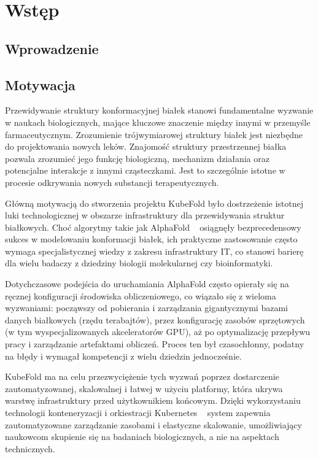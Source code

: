 \chapter{Wstęp}


\section{Wprowadzenie}


\section{Motywacja}

Przewidywanie struktury konformacyjnej białek stanowi fundamentalne wyzwanie w naukach biologicznych, mające kluczowe znaczenie między innymi w przemyśle farmaceutycznym.
Zrozumienie trójwymiarowej struktury białek jest niezbędne do projektowania nowych leków.
Znajomość struktury przestrzennej białka pozwala zrozumieć jego funkcję biologiczną, mechanizm działania oraz potencjalne interakcje z innymi cząsteczkami.
Jest to szczególnie istotne w procesie odkrywania nowych substancji terapeutycznych.

Główną motywacją do stworzenia projektu KubeFold było dostrzeżenie istotnej luki technologicznej w obszarze infrastruktury dla przewidywania struktur białkowych.
Choć algorytmy takie jak AlphaFold ~\cite{alphafold3} osiągnęły bezprecedensowy sukces w modelowaniu konformacji białek, ich praktyczne zastosowanie często wymaga specjalistycznej wiedzy z zakresu infrastruktury IT, co stanowi barierę dla wielu badaczy z dziedziny biologii molekularnej czy bioinformatyki.

Dotychczasowe podejścia do uruchamiania AlphaFold często opierały się na ręcznej konfiguracji środowiska obliczeniowego, co wiązało się z wieloma wyzwaniami: począwszy od pobierania i zarządzania gigantycznymi bazami danych białkowych (rzędu terabajtów), przez konfigurację zasobów sprzętowych (w tym wyspecjalizowanych akceleratorów GPU), aż po optymalizację przepływu pracy i zarządzanie artefaktami obliczeń.
Proces ten był czasochłonny, podatny na błędy i wymagał kompetencji z wielu dziedzin jednocześnie.

KubeFold ma na celu przezwyciężenie tych wyzwań poprzez dostarczenie zautomatyzowanej, skalowalnej i łatwej w użyciu platformy, która ukrywa warstwę infrastruktury przed użytkownikiem końcowym.
Dzięki wykorzystaniu technologii konteneryzacji i orkiestracji Kubernetes ~\cite{kubernetes, container_orchestration} system zapewnia zautomatyzowane zarządzanie zasobami i elastyczne skalowanie, umożliwiający naukowcom skupienie się na badaniach biologicznych, a nie na aspektach technicznych.


